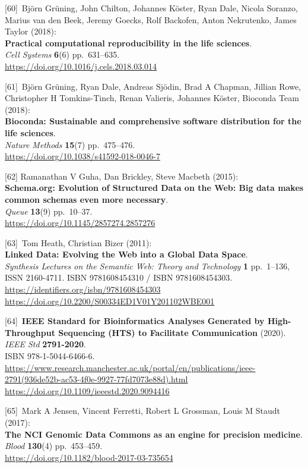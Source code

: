 {[}60{]}~Björn Grüning, John Chilton, Johannes Köster, Ryan Dale, Nicola
Soranzo, Marius van den Beek, Jeremy Goecks, Rolf Backofen, Anton
Nekrutenko, James Taylor (2018):\\
\textbf{Practical computational reproducibility in the life sciences}.\\
\emph{Cell Systems} \textbf{6}(6) pp.~631--635.\\
\url{https://doi.org/10.1016/j.cels.2018.03.014}

{[}61{]}~Björn Grüning, Ryan Dale, Andreas Sjödin, Brad A Chapman,
Jillian Rowe, Christopher H Tomkins-Tinch, Renan Valieris, Johannes
Köster, Bioconda Team (2018):\\
\textbf{Bioconda: Sustainable and comprehensive software distribution
for the life sciences}.\\
\emph{Nature Methods} \textbf{15}(7) pp.~475--476.\\
\url{https://doi.org/10.1038/s41592-018-0046-7}

{[}62{]} Ramanathan V Guha, Dan Brickley, Steve Macbeth (2015):\\
\textbf{Schema.org: Evolution of Structured Data on the Web: Big data
makes common schemas even more necessary}.\\
\emph{Queue} \textbf{13}(9) pp.~10--37.\\
\url{https://doi.org/10.1145/2857274.2857276}

{[}63{]}~Tom Heath, Christian Bizer (2011):\\
\textbf{Linked Data: Evolving the Web into a Global Data Space}.\\
\emph{Synthesis Lectures on the Semantic Web: Theory and Technology}
\textbf{1} pp.~1--136, ISSN 2160-4711. ISBN 9781608454310 / ISBN
9781608454303. \url{https://identifiers.org/isbn/9781608454303}\\
\url{https://doi.org/10.2200/S00334ED1V01Y201102WBE001}

{[}64{]}~\textbf{IEEE Standard for Bioinformatics Analyses Generated by
High-Throughput Sequencing (HTS) to Facilitate Communication} (2020).\\
\emph{IEEE Std} \textbf{2791-2020}.\\
ISBN 978-1-5044-6466-6.\\
\url{https://www.research.manchester.ac.uk/portal/en/publications/ieee-2791(936de52b-ac53-4f0e-9927-77fd7073e88d).html}~\\
\url{https://doi.org/10.1109/ieeestd.2020.9094416}

{[}65{]}~Mark A Jensen, Vincent Ferretti, Robert L Grossman, Louis M
Staudt (2017):\\
\textbf{The NCI Genomic Data Commons as an engine for precision
medicine}.\\
\emph{Blood} \textbf{130}(4) pp.~453--459.\\
\url{https://doi.org/10.1182/blood-2017-03-735654}

